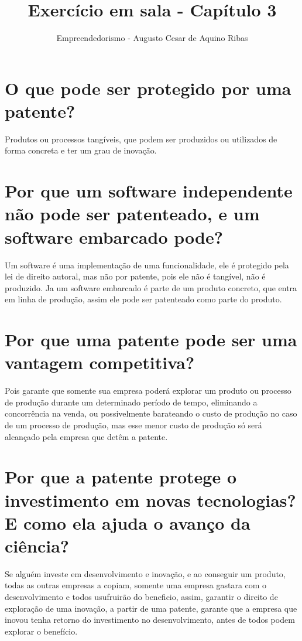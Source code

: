 \documentclass[a4paper,10pt]{article}
\author{Empreendedorismo - Augusto Cesar de Aquino Ribas}
\title{Exercício em sala - Capítulo 3}
\begin{document}
\maketitle

\section{O que pode ser protegido por uma patente?}

Produtos ou processos tangíveis, que podem ser produzidos ou utilizados de forma concreta e ter um grau de inovação.

\section{Por que um software independente não pode ser patenteado, e um software embarcado pode?}

Um software é uma implementação de uma funcionalidade, ele é protegido pela lei de direito autoral, mas não por patente, pois ele não é tangível, não é produzido. 
Ja um software embarcado é parte de um produto concreto, que entra em linha de produção, assim ele pode ser patenteado como parte do produto.

\section{Por que uma patente pode ser uma vantagem competitiva?}

Pois garante que somente sua empresa poderá explorar um produto ou processo de produção durante um determinado período de tempo, eliminando a concorrência na venda, ou possivelmente barateando o custo de produção no caso de um processo de produção, mas esse menor custo de produção só será alcançado pela empresa que detêm a patente.

\section{Por que a patente protege o investimento em novas tecnologias? E como ela ajuda o avanço da ciência?}

Se alguém investe em desenvolvimento e inovação, e ao conseguir um produto, todas as outras empresas a copiam, somente uma empresa gastara com o desenvolvimento e todos usufruirão do beneficio, assim, garantir o direito de exploração de uma inovação, a partir de uma patente, garante que a empresa que inovou tenha retorno do investimento no desenvolvimento, antes de todos podem explorar o benefício.
\end{document}
